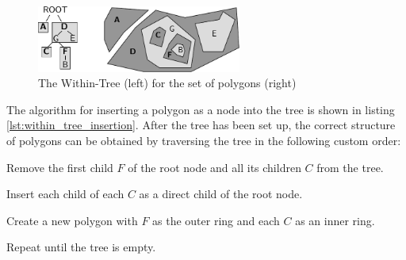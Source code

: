 \begin{figure}[ht]
  \vspace{1em}
  \centering
  \includegraphics[width=0.6\textwidth]{graphics/development/implementation/within_tree}
  \caption{The Within-Tree (left) for the set of polygons (right)}
  \label{fig:within_tree}
\end{figure}

The algorithm for inserting a polygon as a node into the tree is shown in listing \ref{lst:within_tree_insertion}. After the tree has been set up, the correct structure of polygons can be obtained by traversing the tree in the following custom order:

\begin{compactenum}
  \item Remove the first child $F$ of the root node and all its children $C$ from the tree.
  \item Insert each child of each $C$ as a direct child of the root node.
  \item Create a new polygon with $F$ as the outer ring and each $C$ as an inner ring.
  \item Repeat until the tree is empty.
\end{compactenum}



